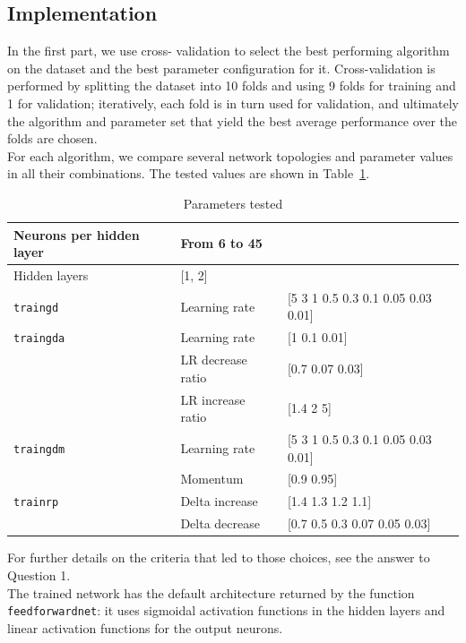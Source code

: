 \documentclass{article}
\begin{document}
\subsection{Implementation}
In the first part, we use cross- validation to select the best performing algorithm on the dataset and the best parameter configuration for it. Cross-validation is performed by splitting the dataset into 10 folds and using 9 folds for training and 1 for validation; iteratively, each fold is in turn used for validation, and ultimately the algorithm and parameter set that yield the best average performance over the folds are chosen.\\
For each algorithm, we compare several network topologies and parameter values in all their combinations. The tested values are shown in Table~\ref{tab:parameters}.\\
\begin{table}
	\centering
	\caption{Parameters tested}
	\label{tab:parameters}

		\begin{tabular}{|l|l|l|}
		\hline
		Neurons per hidden layer & \multicolumn{2}{l|}{From 6 to 45} \\\hline
		Hidden layers		& \multicolumn{2}{l|}{[1, 2]} \\\hline
		\verb$traingd$	&	Learning rate		&	[5 3 1 0.5 0.3 0.1 0.05 0.03 0.01] \\\hline
		\verb$traingda$	&	Learning rate & [1 0.1 0.01] \\\cline{2-3}
										& LR decrease ratio	&	[0.7 0.07 0.03] \\\cline{2-3}
										& LR increase ratio & [1.4 2 5]	\\\hline
		\verb$traingdm$	&	Learning rate	&	[5 3 1 0.5 0.3 0.1 0.05 0.03 0.01]	\\\cline{2-3}
										&	Momentum			&	[0.9 0.95]	\\\hline
		\verb$trainrp$	&	Delta increase	&	[1.4 1.3 1.2 1.1]	\\\cline{2-3}
										&	Delta decrease	&	[0.7 0.5 0.3 0.07 0.05 0.03]	\\
		\hline		
		\end{tabular}
\end{table}
For further details on the criteria that led to those choices, see the answer to Question 1.\\
The trained network has the default architecture returned by the function \verb$feedforwardnet$: it uses sigmoidal activation functions in the hidden layers and linear activation functions for the output neurons. %
\end{document}
